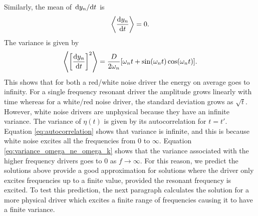 Similarly, the mean of $\dv*{y_n}{t}$ is 
\begin{equation}
    \left\langle \dv{y_n}{t} \right\rangle=0.
\end{equation}
The variance is given by
\begin{equation}
    \left\langle \qty[\dv{y_n}{t}]^2 \right\rangle=\frac{D}{2\omega_n}[\omega_n t + \sin(\omega_n t) \cos(\omega_n t)].
\end{equation}
This shows that for both a red/white noise driver the energy on average goes to infinity. For a single frequency resonant driver the amplitude grows linearly with time whereas for a white/red noise driver, the standard deviation grows as $\sqrt{t}$. However, white noise drivers are unphysical because they have an infinite variance. The variance of $\eta(t)$ is given by its autocorrelation for $t=t'$. Equation \eqref{eq:autocorrelation} shows that variance is infinite, and this is because white noise excites all the frequencies from $0$ to $\infty$. Equation \eqref{eq:variance_omega_ne_omega_k} shows that the variance associated with the higher frequency drivers goes to $0$ as $f\rightarrow\infty$. For this reason, we predict the solutions above provide a good approximation for solutions where the driver only excites frequencies up to a finite value, provided the resonant frequency is excited. To test this prediction, the next paragraph calculates the solution for a more physical driver which excites a finite range of frequencies causing it to have a finite variance.

